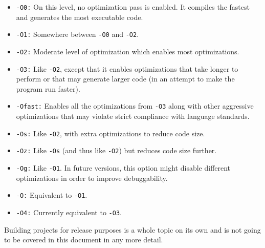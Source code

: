 \begin{itemize}
    \item \texttt{-O0:} On this level, no optimization pass is enabled. It compiles
    the fastest and generates the most executable code.
    \item \texttt{-O1:} Somewhere between \texttt{-O0} and \texttt{-O2}.
    \item \texttt{-O2:} Moderate level of optimization which enables most optimizations.
    \item \texttt{-O3:} Like \texttt{-O2}, except that it enables optimizations
    that take longer to perform or that may generate larger code (in an attempt
    to make the program run faster).
    \item \texttt{-Ofast:} Enables all the optimizations from \texttt{-O3} along
    with other aggressive optimizations that may violate strict compliance with
    language standards.
    \item \texttt{-Os:} Like \texttt{-O2}, with extra optimizations to reduce code size. 
    \item \texttt{-Oz:} Like \texttt{-Os} (and thus like \texttt{-O2}) but reduces
    code size further.
    \item \texttt{-Og:} Like \texttt{-O1}. In future versions, this option might
    disable different optimizations in order to improve debuggability.
    \item \texttt{-O:} Equivalent to \texttt{-O1}.
    \item \texttt{-O4:} Currently equivalent to \texttt{-O3}.
\end{itemize}

Building projects for release purposes is a whole topic on its own and is not going
to be covered in this document in any more detail. 
